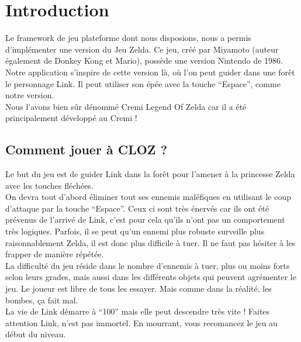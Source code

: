 \documentclass[a4paper,11pt]{article}
\begin{document}
\newpage

\section{Introduction}
Le framework de jeu plateforme dont nous disposions, nous a permis
d'impl\'ementer une version du Jeu Zelda. Ce jeu, cr\'e\'e par Miyamoto (auteur
\'egalement de Donkey Kong et Mario), poss\`ede une version Nintendo de 1986. \\

Notre application s'inspire de cette version l\`a, o\`u l'on peut guider dans une
for\^et le personnage Link. Il peut utiliser son \'ep\'ee avec la touche ``Espace'', comme notre version. \\
Nous l'avons bien sûr d\'enomm\'e Cremi Legend Of Zelda car il a \'et\'e principalement
d\'evelopp\'e au Cremi !

\subsection{Comment jouer \`a CLOZ ?}
Le but du jeu est de guider Link dans la for\^et pour l'amener \`a la
princesse Zelda avec les
touches fl\'ech\'ees. \\ 
On devra tout d'abord \'eliminer tout ses ennemis mal\'efiques en utilisant le coup
d'attaque par la touche ``Espace''. Ceux ci sont tr\`es \'enerv\'es car
ils ont \'et\'e pr\'evenus de l'arriv\'e de Link, c'est pour cela qu'ils n'ont pas un
comportement tr\`es logiques. Parfois, il se peut qu'un ennemi plus robuste
surveille plus raisonnablement Zelda, il est donc plus difficile \`a
tuer. Il ne faut pas h\'esiter \`a les frapper de manière r\'ep\'et\'ee.\\

La difficult\'e du jeu r\'eside dans le nombre d'ennemis \`a tuer, plus ou moins
forts selon leurs grades, mais aussi dans les diff\'erents objets
qui peuvent agr\'ementer le jeu. Le joueur est libre de tous les
essayer. Mais comme dans la r\'ealit\'e, les bombes, ça fait mal.\\

La vie de Link d\'emarre \`a ``100'' mais elle peut descendre tr\`es
vite ! Faites attention Link, n'est pas immortel. En mourrant, vous
recomancez le jeu au d\'ebut du niveau.
\end{document}

